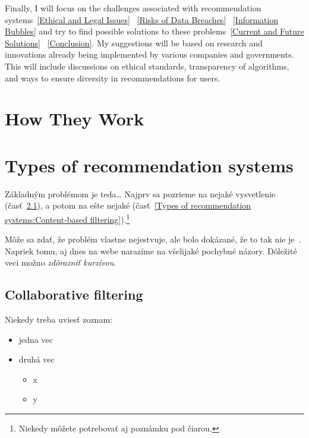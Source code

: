 \documentclass[10pt,twoside,slovak,a4paper]{article}
\begin{document}
Finally, I will focus on the challenges associated with recommendation systems~\ref{Ethical and Legal Issues} ~\ref{Risks of Data Breaches} ~\ref{Information Bubbles} and try to find possible solutions to these problems~\ref{Current and Future Solutions} ~\ref{Conclusion}. My suggestions will be based on research and innovations already being implemented by various companies and governments. This will include discussions on ethical standards, transparency of algorithms, and ways to ensure diversity in recommendations for users.




\section{How They Work} \label{How They Work}
 


\section{Types of recommendation systems} \label{Types of recommendation systems}

Základným problémom je teda\ldots{} Najprv sa pozrieme na nejaké vysvetlenie (časť~\ref{Types of recommendation systems:Collaborative filtering}), a potom na ešte nejaké (časť~\ref{Types of recommendation systems:Content-based filtering}).\footnote{Niekedy môžete potrebovať aj poznámku pod čiarou.}

Môže sa zdať, že problém vlastne nejestvuje\cite{Coplien:MPD}, ale bolo dokázané, že to tak nie je~\cite{Czarnecki:Staged, Czarnecki:Progress}. Napriek tomu, aj dnes na webe narazíme na všelijaké pochybné názory\cite{PLP-Framework}. Dôležité veci možno \emph{zdôrazniť kurzívou}.


\subsection{Collaborative filtering} \label{Types of recommendation systems:Collaborative filtering}

Niekedy treba uviesť zoznam:

\begin{itemize}
\item jedna vec
\item druhá vec
	\begin{itemize}
	\item x
	\item y
	\end{itemize}
\end{itemize}
\end{document}
